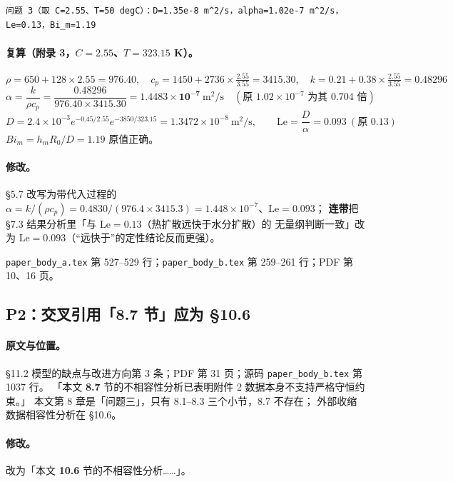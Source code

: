 \documentclass[11pt,a4paper]{ctexart}
\newcommand{\src}[1]{\texttt{#1}}
\newcommand{\loc}[1]{\textcolor{blue!60!black}{#1}}
\begin{document}
\begin{lstlisting}[style=old]
问题 3（取 C=2.55、T=50 degC）：D=1.35e-8 m^2/s，alpha=1.02e-7 m^2/s，Le=0.13，Bi_m=1.19
\end{lstlisting}

\paragraph{复算（附录 3，$C=2.55$、$T=323.15$ K）。}
\[
\rho=650+128\times2.55=976.40,\quad
c_p=1450+2736\times\tfrac{2.55}{3.55}=3415.30,\quad
k=0.21+0.38\times\tfrac{2.55}{3.55}=0.48296
\]
\[
\alpha=\frac{k}{\rho c_p}=\frac{0.48296}{976.40\times3415.30}
=\mathbf{1.4483\times10^{-7}}\ \mathrm{m^2/s}\quad(\text{原 }1.02\times10^{-7}\text{ 为其 }0.704\text{ 倍})
\]
\[
D=2.4\times10^{-3}e^{-0.45/2.55}e^{-3850/323.15}=1.3472\times10^{-8}\ \mathrm{m^2/s},
\qquad \mathrm{Le}=\frac{D}{\alpha}=\mathbf{0.093}\ (\text{原 }0.13)
\]
$Bi_m=h_mR_0/D=1.19$ 原值正确。

\paragraph{修改。}§5.7 改写为带代入过程的
$\alpha=k/(\rho c_p)=0.4830/(976.4\times3415.3)=1.448\times10^{-7}$、$\mathrm{Le}=0.093$；
\textbf{连带}把 §7.3 结果分析里「与 $\mathrm{Le}=0.13$（热扩散远快于水分扩散）的
无量纲判断一致」改为 $\mathrm{Le}=0.093$（“远快于”的定性结论反而更强）。

\loc{\src{paper\_body\_a.tex} 第 527--529 行；\src{paper\_body\_b.tex} 第 259--261 行；PDF 第 10、16 页}。

\subsection{P2：交叉引用「8.7 节」应为 §10.6}

\paragraph{原文与位置。}\loc{§11.2 模型的缺点与改进方向第 3 条；PDF 第 31 页；源码 \src{paper\_body\_b.tex} 第 1037 行}。
「本文 \textbf{8.7} 节的不相容性分析已表明附件 2 数据本身不支持严格守恒约束。」
本文第 8 章是「问题三」，只有 8.1--8.3 三个小节，8.7 不存在；
外部收缩数据相容性分析在 §10.6。

\paragraph{修改。}改为「本文 \textbf{10.6} 节的不相容性分析……」。
\end{document}
